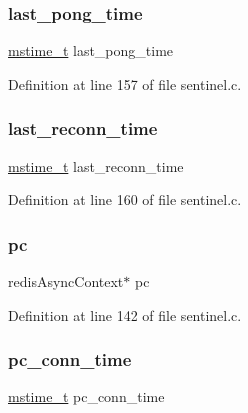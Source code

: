 \subsubsection{\texorpdfstring{last\+\_\+pong\+\_\+time}{last\_pong\_time}}
{\footnotesize\ttfamily \hyperlink{redismodule_8h_a652ae61e2475bc8957454534544968fc}{mstime\+\_\+t} last\+\_\+pong\+\_\+time}



Definition at line 157 of file sentinel.\+c.

\mbox{\label{structinstance_link_ab333e48e13c659a387c659e1bc4e02e1}} 
\subsubsection{\texorpdfstring{last\+\_\+reconn\+\_\+time}{last\_reconn\_time}}
{\footnotesize\ttfamily \hyperlink{redismodule_8h_a652ae61e2475bc8957454534544968fc}{mstime\+\_\+t} last\+\_\+reconn\+\_\+time}



Definition at line 160 of file sentinel.\+c.

\mbox{\label{structinstance_link_afe761f1776d1b45b7abadf158f8bbe37}} 
\subsubsection{\texorpdfstring{pc}{pc}}
{\footnotesize\ttfamily redis\+Async\+Context$\ast$ pc}



Definition at line 142 of file sentinel.\+c.

\mbox{\label{structinstance_link_a12befcf62811f417eaf23da1076547bc}} 
\subsubsection{\texorpdfstring{pc\+\_\+conn\+\_\+time}{pc\_conn\_time}}
{\footnotesize\ttfamily \hyperlink{redismodule_8h_a652ae61e2475bc8957454534544968fc}{mstime\+\_\+t} pc\+\_\+conn\+\_\+time}




